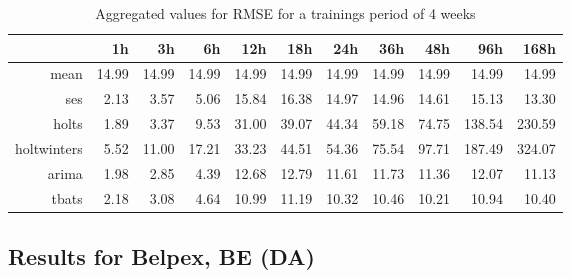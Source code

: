 \begin{table}[ht]
\centering
\begin{tabular}{rrrrrrrrrrr}
  \hline
 & 1h & 3h & 6h & 12h & 18h & 24h & 36h & 48h & 96h & 168h \\ 
  \hline
mean & 14.99 & 14.99 & 14.99 & 14.99 & 14.99 & 14.99 & 14.99 & 14.99 & 14.99 & 14.99 \\ 
  ses & 2.13 & 3.57 & 5.06 & 15.84 & 16.38 & 14.97 & 14.96 & 14.61 & 15.13 & 13.30 \\ 
  holts & 1.89 & 3.37 & 9.53 & 31.00 & 39.07 & 44.34 & 59.18 & 74.75 & 138.54 & 230.59 \\ 
  holtwinters & 5.52 & 11.00 & 17.21 & 33.23 & 44.51 & 54.36 & 75.54 & 97.71 & 187.49 & 324.07 \\ 
  arima & 1.98 & 2.85 & 4.39 & 12.68 & 12.79 & 11.61 & 11.73 & 11.36 & 12.07 & 11.13 \\ 
  tbats & 2.18 & 3.08 & 4.64 & 10.99 & 11.19 & 10.32 & 10.46 & 10.21 & 10.94 & 10.40 \\ 
   \hline
\end{tabular}
\caption{Aggregated values for RMSE for a trainings period of 4 weeks}
\end{table}



\subsection{Results for Belpex, BE (DA)}

